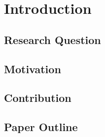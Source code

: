 \section{Introduction}

\subsection{Research Question}

\subsection{Motivation}

\subsection{Contribution}

\subsection{Paper Outline}
